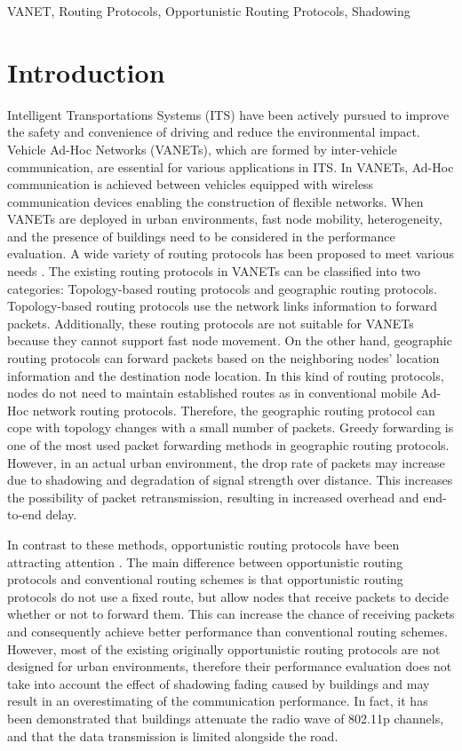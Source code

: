 \documentclass[conference]{IEEEtran}
\begin{document}
\begin{IEEEkeywords}
VANET, Routing Protocols, Opportunistic Routing Protocols, Shadowing
\end{IEEEkeywords}

\section{Introduction}
Intelligent Transportations Systems (ITS) \cite{1} have been actively pursued to improve the safety and convenience of driving and  reduce the environmental impact. 
Vehicle Ad-Hoc Networks (VANETs), which are formed by inter-vehicle communication, are essential for various applications in ITS.
In VANETs,  Ad-Hoc communication is achieved between vehicles equipped with wireless communication devices enabling the construction of flexible networks. 
When VANETs are deployed in  urban environments, fast node mobility, heterogeneity, and the presence of buildings need to be considered in the performance evaluation. A wide variety of routing protocols has been proposed to meet various needs \cite{2}.
The existing routing protocols in VANETs can be classified into two categories: Topology-based routing protocols and geographic routing protocols. Topology-based routing protocols \cite{3,4,5} use the network links information to forward packets. 
Additionally, these routing protocols are not suitable for VANETs because they cannot support fast node movement. On the other hand, geographic routing protocols \cite{6,7,8,9,10,11,12,13,14,15} can forward packets based on the neighboring nodes' location information and the destination node location. 
In this kind of routing protocols, nodes do not need to maintain established routes as in conventional mobile Ad-Hoc network routing protocols. 
Therefore, the geographic routing protocol can cope with topology changes with a small number of packets.
Greedy forwarding is one of the most used packet forwarding methods in geographic routing protocols.
However, in an actual urban environment, the drop rate of packets may increase due to shadowing and degradation of signal strength over distance. This increases the possibility of packet retransmission, resulting in increased overhead and end-to-end delay. 

In contrast to these methods, opportunistic routing protocols have been attracting attention \cite{16}. 
The main difference between opportunistic routing protocols and conventional routing schemes is that opportunistic routing protocols do not use a fixed route, but allow nodes that receive packets to decide whether or not to forward them. 
This can increase the chance of receiving packets and consequently achieve better performance than conventional routing schemes.
However, most of the existing originally opportunistic routing protocols  are not designed for urban environments, therefore their performance evaluation does not take into account the effect of shadowing fading caused by buildings and may result in an overestimating of the communication performance. 
In fact, it has been demonstrated that buildings attenuate the radio wave of 802.11p channels, and that the data transmission is limited alongside the road\cite{17}. 
\end{document}
